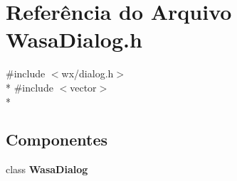 \section{Referência do Arquivo Wasa\+Dialog.\+h}
\label{_wasa_dialog_8h}
{\ttfamily \#include $<$wx/dialog.\+h$>$}\\*
{\ttfamily \#include $<$vector$>$}\\*
\subsection*{Componentes}
\begin{DoxyCompactItemize}
\item 
class {\bf Wasa\+Dialog}
\end{DoxyCompactItemize}
